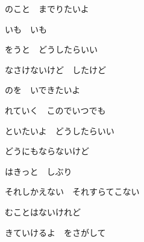 \documentclass[a4paper,tate,twocolumn,12pt]{ltjtarticle}
\begin{document}
\begin{flushleft}
\begin{minipage}{\linewidth}
のこと　までりたいよ

いも　いも

をうと　どうしたらいい
\end{minipage}

\vspace{2em}

\noindent\begin{minipage}{\linewidth}
なさけないけど　したけど

のを　いできたいよ

れていく　このでいつでも

といたいよ　どうしたらいい

どうにもならないけど
\end{minipage}

\vspace{2em}

\noindent\begin{minipage}{\linewidth}
はきっと　しぶり

それしかえない　それすらてこない

むことはないけれど

きていけるよ　をさがして
\end{minipage}

\end{flushleft}
\end{document}

